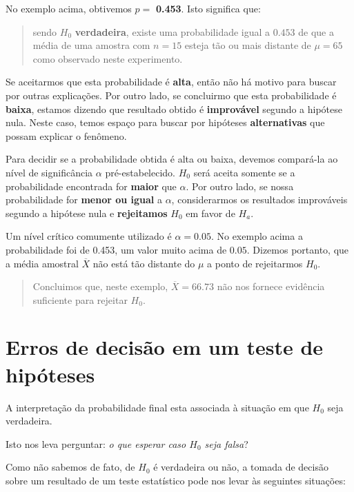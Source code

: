\documentclass[
]{book}
\begin{document}
No exemplo acima, obtivemos \(p =\) \textbf{0.453}. Isto significa que:

\begin{quote}
sendo \(H_0\) \textbf{verdadeira}, existe uma probabilidade igual a \(0.453\) de que a média de uma amostra com \(n = 15\) esteja tão ou mais distante de \(\mu = 65\) como observado neste experimento.
\end{quote}

Se aceitarmos que esta probabilidade é \textbf{alta}, então não há motivo para buscar por outras explicações. Por outro lado, se concluirmo que esta probabilidade é \textbf{baixa}, estamos dizendo que resultado obtido é \textbf{improvável} segundo a hipótese nula. Neste caso, temos espaço para buscar por hipóteses \textbf{alternativas} que possam explicar o fenômeno.

Para decidir se a probabilidade obtida é alta ou baixa, devemos compará-la ao nível de significância \(\alpha\) pré-estabelecido. \(H_0\) será aceita somente se a probabilidade encontrada for \textbf{maior} que \(\alpha\). Por outro lado, se nossa probabilidade for \textbf{menor ou igual} a \(\alpha\), considerarmos os resultados improváveis segundo a hipótese nula e \textbf{rejeitamos} \(H_0\) em favor de \(H_a\).

Um nível crítico comumente utilizado é \(\alpha = 0.05\). No exemplo acima a probabilidade foi de 0.453, um valor muito acima de \(0.05\). Dizemos portanto, que a média amostral \(\overline{X}\) não está tão distante do \(\mu\) a ponto de rejeitarmos \(H_0\).

\begin{quote}
Concluimos que, neste exemplo, \(\overline{X} = 66.73\) não nos fornece evidência suficiente para rejeitar \(H_0\).
\end{quote}

\hypertarget{erros-de-decisuxe3o-em-um-teste-de-hipuxf3teses}{%
\section{Erros de decisão em um teste de hipóteses}\label{erros-de-decisuxe3o-em-um-teste-de-hipuxf3teses}}

A interpretação da probabilidade final esta associada à situação em que \(H_0\) seja verdadeira.

Isto nos leva perguntar: \emph{o que esperar caso \(H_0\) seja falsa}?

Como não sabemos de fato, de \(H_0\) é verdadeira ou não, a tomada de decisão sobre um resultado de um teste estatístico pode nos levar às seguintes situações:
\end{document}

